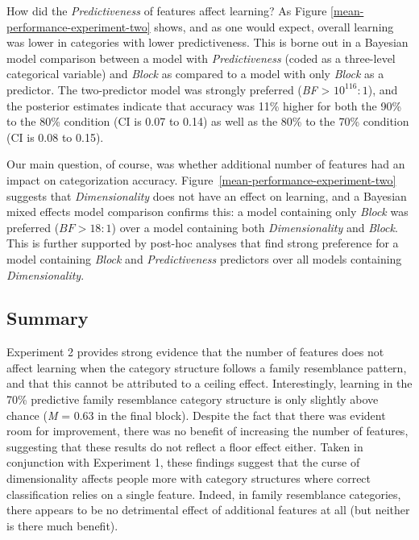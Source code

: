 \documentclass[a4paper, doc, floatsintext]{apa6}
\begin{document}
How did the \textit{Predictiveness} of features affect learning? As Figure \ref{mean-performance-experiment-two} shows, and as one would expect, overall learning was lower in categories with lower predictiveness. This is borne out in a Bayesian model comparison between a model with \textit{Predictiveness} (coded as a three-level categorical variable) and \textit{Block} as compared to a model with only \textit{Block} as a predictor. The two-predictor model was strongly preferred (\textit{BF} > \(10^{116}:1\)), and the posterior estimates indicate that accuracy was 11\% higher for both the 90\% to the 80\% condition (CI is 0.07 to 0.14) as well as the 80\% to the 70\% condition (CI is 0.08 to 0.15).

Our main question, of course, was whether additional number of features had an impact on categorization accuracy. Figure~\ref{mean-performance-experiment-two} suggests that \textit{Dimensionality} does not have an effect on learning, and a Bayesian mixed effects model comparison confirms this: a model containing only \textit{Block} was preferred ($\textit{BF} > 18:1$) over a model containing both \textit{Dimensionality} and \textit{Block}. This is further supported by post-hoc analyses that find strong preference for a model containing \textit{Block} and \textit{Predictiveness} predictors over all models containing \textit{Dimensionality}.

\subsection{Summary}

Experiment 2 provides strong evidence that the number of features does not affect learning when the category structure follows a family resemblance pattern, and that this cannot be attributed to a ceiling effect. Interestingly, learning in the 70\% predictive family resemblance category structure is only slightly above chance (\textit{M} = 0.63 in the final block). Despite the fact that there was evident room for improvement, there was no benefit of increasing the number of features, suggesting that these results do not reflect a floor effect either. Taken in conjunction with Experiment 1, these findings suggest that the curse of dimensionality affects people more with category structures where correct classification relies on a single feature. Indeed, in family resemblance categories, there appears to be no detrimental effect of additional features at all (but neither is there much benefit).
\end{document}
